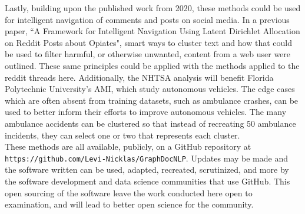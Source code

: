 Lastly, building upon the published work from 2020, these methods could be used for intelligent navigation of comments and posts on social media. In a previous paper, ``A Framework for Intelligent Navigation Using Latent Dirichlet Allocation on Reddit Posts about Opiates", smart ways to cluster text and how that could be used to filter harmful, or otherwise unwanted, content from a web user were outlined. These same principles could be applied with the methods applied to the reddit threads here. Additionally, the NHTSA analysis will benefit Florida Polytechnic University's AMI, which study autonomous vehicles. The edge cases which are often absent from training datasets, such as ambulance crashes, can be used to better inform their efforts to improve autonomous vehicles. The many ambulance accidents can be clustered so that instead of recreating 50 ambulance incidents, they can select one or two that represents each cluster. \\

These methods are all available, publicly, on a GitHub repository at \texttt{https://github.com/Levi-Nicklas/GraphDocNLP}. Updates may be made and the software written can be used, adapted, recreated, scrutinized, and more by the software development and data science communities that use GitHub. This open sourcing of the software leave the work conducted here open to examination, and will lead to better open science for the community.

\nocite{vishwanathan2010graph}
\nocite{kriege2020survey}
\nocite{nikolentzos2017shortest}
\nocite{kondor2002diffusion}
\nocite{vazirgiannis2018graphrep}
\nocite{cheng2006n}
\nocite{rosenfeld2020kernel}
\nocite{akioyamen2020framework}
\nocite{wickham2019welcome}
\nocite{sugiyama2018graphkernels}
\nocite{sugiyama2015halting}
\nocite{csardi2013package}
\nocite{csardi2006igraph}
\nocite{silge2016tidytext}
\nocite{rivera2015package}
\nocite{wickham2010stringr}
\nocite{bengtsson2020unifying}







